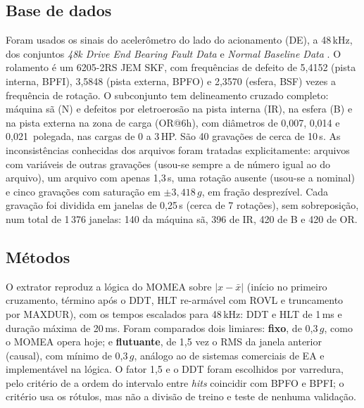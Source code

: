 \subsection{Base de dados}
\label{cwru:sec:dados}

Foram usados os sinais do acelerômetro do lado do acionamento (DE), a 48\,kHz, dos conjuntos \textit{48k Drive End Bearing Fault Data} e \textit{Normal Baseline Data} \cite{cwru}. O rolamento é um 6205-2RS JEM SKF, com frequências de defeito de 5,4152 (pista interna, BPFI), 3,5848 (pista externa, BPFO) e 2,3570 (esfera, BSF) vezes a frequência de rotação. O subconjunto tem delineamento cruzado completo: máquina sã (N) e defeitos por eletroerosão na pista interna (IR), na esfera (B) e na pista externa na zona de carga (OR@6h), com diâmetros de 0,007, 0,014 e 0,021~polegada, nas cargas de 0 a 3\,HP. São 40 gravações de cerca de 10\,s. As inconsistências conhecidas dos arquivos foram tratadas explicitamente: arquivos com variáveis de outras gravações (usou-se sempre a de número igual ao do arquivo), um arquivo com apenas 1,3\,s, uma rotação ausente (usou-se a nominal) e cinco gravações com saturação em \(\pm 3{,}418\,g\), em fração desprezível. Cada gravação foi dividida em janelas de 0,25\,s (cerca de 7 rotações), sem sobreposição, num total de 1\,376 janelas: 140 da máquina sã, 396 de IR, 420 de B e 420 de OR.

\subsection{Métodos}
\label{cwru:sec:metodos}

O extrator reproduz a lógica do MOMEA sobre \(|x - \bar{x}|\) (início no primeiro cruzamento, término após o DDT, HLT re-armável com ROVL e truncamento por MAXDUR), com os tempos escalados para 48\,kHz: DDT e HLT de 1\,ms e duração máxima de 20\,ms. Foram comparados dois limiares: \textbf{fixo}, de 0,3\,\(g\), como o MOMEA opera hoje; e \textbf{flutuante}, de 1,5 vez o RMS da janela anterior (causal), com mínimo de 0,3\,\(g\), análogo ao de sistemas comerciais de EA \cite{vallen2022} e implementável na lógica. O fator 1,5 e o DDT foram escolhidos por varredura, pelo critério de a ordem do intervalo entre \textit{hits} coincidir com BPFO e BPFI; o critério usa os rótulos, mas não a divisão de treino e teste de nenhuma validação.

